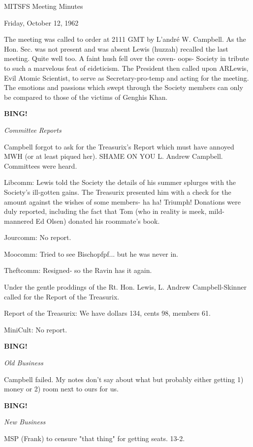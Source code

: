 \documentclass[12pt]{article}
\newcommand{\bing}{{\bf BING!} }
\newcommand{\goto}[1]{\bing \vskip 12pt \centerline{{\em{#1}}}}
\begin{document}
\begin{center}

MITSFS Meeting Minutes

Friday, October 12, 1962

\end{center}
 
\vspace{12pt}

\setlength{\parskip}{6pt}

\noindent
The meeting was called to order at 2111 GMT by L'andr\'e W. Campbell. As the Hon. Sec. was not present and was absent Lewis (huzzah) recalled the last meeting. Quite well too. A faint hush fell over the coven- oops- Society in tribute to such a marvelous feat of eideticism. The President then called upon ARLewis, Evil Atomic Scientist, to serve as Secretary-pro-temp and acting for the meeting. The emotions and passions which swept through the Society members can only be compared to those of the victims of Genghis Khan.

\goto{Committee Reports}

Campbell forgot to ask for the Treasurix's Report which must have annoyed MWH (or at least piqued her). SHAME ON YOU L. Andrew Campbell. Committees were heard.

Libcomm: Lewis told the Society the details of his summer splurges with the Society's ill-gotten gains. The Treasurix presented him with a check for the amount against the wishes of some members- ha ha! Triumph! Donations were duly reported, including the fact that Tom (who in reality is meek, mild-mannered Ed Olsen) donated his roommate's book.

Jourcomm: No report.

Moocomm: Tried to see Bischopfpf... but he was never in.

Theftcomm: Resigned- so the Ravin has it again.

Under the gentle proddings of the Rt. Hon. Lewis, L. Andrew Campbell-Skinner called for the Report of the Treasurix.

Report of the Treasurix: We have dollars 134, cents 98, members 61.

MiniCult: No report.

\goto{Old Business}

Campbell failed. My notes don't say about what but probably either getting 1) money or 2) room next to ours for us.

\goto{New Business}

MSP (Frank) to censure "that thing" for getting seats. 13-2.
\end{document}
